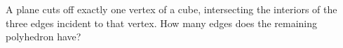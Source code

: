 A plane cuts off exactly one vertex of a cube, intersecting the interiors of the three edges incident to that vertex. How many edges does the remaining polyhedron have?
